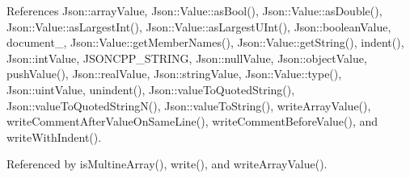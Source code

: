 References Json\+::array\+Value, Json\+::\+Value\+::as\+Bool(), Json\+::\+Value\+::as\+Double(), Json\+::\+Value\+::as\+Largest\+Int(), Json\+::\+Value\+::as\+Largest\+U\+Int(), Json\+::boolean\+Value, document\+\_\+, Json\+::\+Value\+::get\+Member\+Names(), Json\+::\+Value\+::get\+String(), indent(), Json\+::int\+Value, J\+S\+O\+N\+C\+P\+P\+\_\+\+S\+T\+R\+I\+NG, Json\+::null\+Value, Json\+::object\+Value, push\+Value(), Json\+::real\+Value, Json\+::string\+Value, Json\+::\+Value\+::type(), Json\+::uint\+Value, unindent(), Json\+::value\+To\+Quoted\+String(), Json\+::value\+To\+Quoted\+String\+N(), Json\+::value\+To\+String(), write\+Array\+Value(), write\+Comment\+After\+Value\+On\+Same\+Line(), write\+Comment\+Before\+Value(), and write\+With\+Indent().



Referenced by is\+Multine\+Array(), write(), and write\+Array\+Value().


